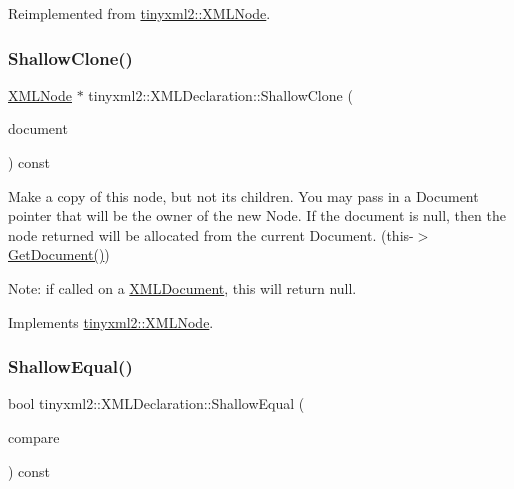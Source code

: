 Reimplemented from \mbox{\hyperlink{classtinyxml2_1_1_x_m_l_node_a916e498914baecbc9a1f012352ef7c69}{tinyxml2\+::\+X\+M\+L\+Node}}.

\mbox{\label{classtinyxml2_1_1_x_m_l_declaration_ad9d60e6d2df75c13eb6bf7319985b747}} 
\subsubsection{\texorpdfstring{Shallow\+Clone()}{ShallowClone()}}
{\footnotesize\ttfamily \mbox{\hyperlink{classtinyxml2_1_1_x_m_l_node}{X\+M\+L\+Node}} $\ast$ tinyxml2\+::\+X\+M\+L\+Declaration\+::\+Shallow\+Clone (\begin{DoxyParamCaption}\item[{\mbox{\hyperlink{classtinyxml2_1_1_x_m_l_document}{X\+M\+L\+Document}} $\ast$}]{document }\end{DoxyParamCaption}) const\hspace{0.3cm}{\ttfamily [virtual]}}

Make a copy of this node, but not its children. You may pass in a Document pointer that will be the owner of the new Node. If the \textquotesingle{}document\textquotesingle{} is null, then the node returned will be allocated from the current Document. (this-\/$>$\mbox{\hyperlink{classtinyxml2_1_1_x_m_l_node_af343d1ef0b45c0020e62d784d7e67a68}{Get\+Document()}})

Note\+: if called on a \mbox{\hyperlink{classtinyxml2_1_1_x_m_l_document}{X\+M\+L\+Document}}, this will return null. 

Implements \mbox{\hyperlink{classtinyxml2_1_1_x_m_l_node_a8402cbd3129d20e9e6024bbcc0531283}{tinyxml2\+::\+X\+M\+L\+Node}}.

\mbox{\label{classtinyxml2_1_1_x_m_l_declaration_ae8b4d3a399857029f36c322b0801b69c}} 
\subsubsection{\texorpdfstring{Shallow\+Equal()}{ShallowEqual()}}
{\footnotesize\ttfamily bool tinyxml2\+::\+X\+M\+L\+Declaration\+::\+Shallow\+Equal (\begin{DoxyParamCaption}\item[{const \mbox{\hyperlink{classtinyxml2_1_1_x_m_l_node}{X\+M\+L\+Node}} $\ast$}]{compare }\end{DoxyParamCaption}) const\hspace{0.3cm}{\ttfamily [virtual]}}


